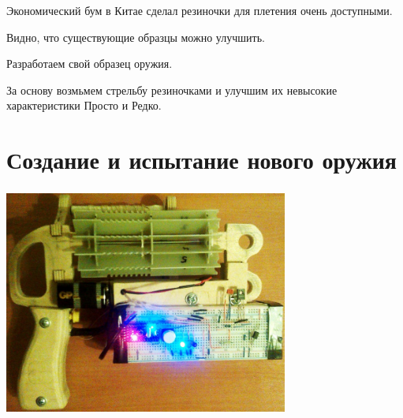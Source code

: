 Экономический бум в Китае сделал резиночки для плетения очень доступными.

\begin{frame}
    \begin{center}
        Видно, что существующие образцы можно улучшить. 
        
        \par\bigskip
        
        Разработаем свой образец оружия.
        
        \par\bigskip

        За основу возмьмем стрельбу резиночками и улучшим их невысокие характеристики \alert{Просто} и \alert{Редко}.
    \end{center}
\end{frame}


\section{Создание и испытание нового оружия}

\begin{frame}
    \frametitle{\myDevice}
    
    \begin{center}
        \includegraphics[width=0.7\textwidth]{fig/device}
    \end{center}
\end{frame}

